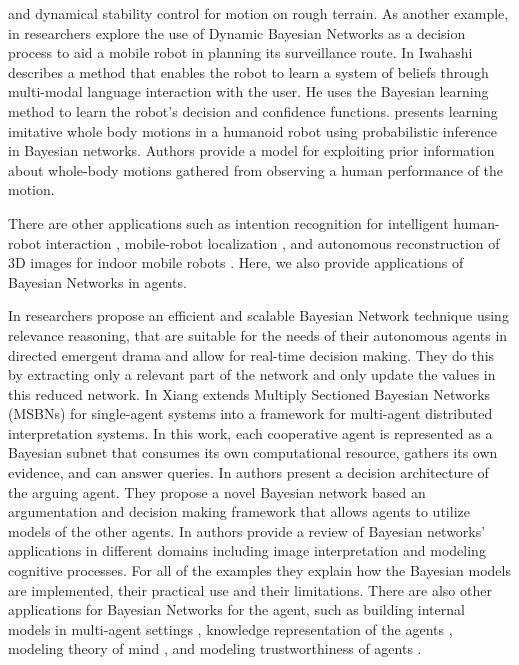 \documentclass[11pt]{article}
\begin{document}
and dynamical stability control for motion on rough terrain. As another example,
in \cite{chong:bbn-decision-planning} researchers explore the use of Dynamic
Bayesian Networks as a decision process to aid a mobile robot in planning its
surveillance route. In \cite{iwahashi:belief-system-hri} Iwahashi describes a
method that enables the robot to learn a system of beliefs through multi-modal
language interaction with the user. He uses the Bayesian learning method to
learn the robot's decision and confidence functions.
\cite{grimes:imitation-robot-bayesian} presents learning imitative whole body
motions in a humanoid robot using probabilistic inference in Bayesian networks.
Authors provide a model for exploiting prior information about whole-body
motions gathered from observing a human performance of the motion. 

There are other applications such as intention recognition for intelligent
human-robot interaction \cite{tahboub:hri-dbn}, mobile-robot localization
\cite{zhou:mobile-robot-localization} \cite{fox:bayesian-location}, and
autonomous reconstruction of 3D images for indoor mobile robots
\cite{delage:dbn-image-reconstruction}. Here, we also provide applications of
Bayesian Networks in agents. 

In \cite{arinbjarnar:bn-agent-drama} researchers propose an efficient and
scalable Bayesian Network technique using relevance reasoning, that are
suitable for the needs of their autonomous agents in directed emergent drama and
allow for real-time decision making. They do this by extracting only a relevant
part of the network and only update the values in this reduced network. In
\cite{xiang:dai-bn} Xiang extends Multiply Sectioned Bayesian Networks (MSBNs)
for single-agent systems into a framework for multi-agent distributed
interpretation systems. In this work, each cooperative agent is represented as a
Bayesian subnet that consumes its own computational resource, gathers its own
evidence, and can answer queries. In \cite{saha:bayes-negotiation} authors
present a decision architecture of the arguing agent. They propose a novel
Bayesian network based an argumentation and decision making framework that
allows agents to utilize models of the other agents. In
\cite{grootswagers:bbn-applications} authors provide a review of Bayesian
networks' applications in different domains including image interpretation and
modeling cognitive processes. For all of the examples they explain how the
Bayesian models are implemented, their practical use and their limitations.
There are also other applications for Bayesian Networks for the agent, such as
building internal models in multi-agent settings \cite{nielsen:fusion-bn-mas},
knowledge representation of the agents \cite{bloemeke:agent-encapsulated-bn}
\cite{santos:cognitive-knowledge-representation}
\cite{martin:reasoning-action-bbn}, modeling theory of mind
\cite{baker:bayesian-tom} \cite{bello:cginitive-foundation-tom}, and modeling
trustworthiness of agents \cite{tan:trust-bbn}.\\ \\ \\
\end{document}
